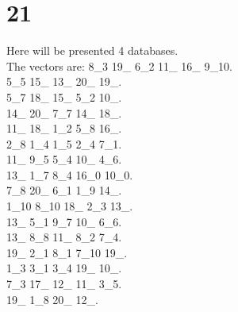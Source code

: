 \chapter{21}
\indent Here will be presented 4 databases.\\
The vectors are:
8\_3 19\_ 6\_2 11\_ 16\_ 9\_10.\\5\_5 15\_ 13\_ 20\_ 19\_.\\5\_7 18\_ 15\_ 5\_2 10\_.\\14\_ 20\_ 7\_7 14\_ 18\_.\\11\_ 18\_ 1\_2 5\_8 16\_.\\2\_8 1\_4 1\_5 2\_4 7\_1.\\11\_ 9\_5 5\_4 10\_ 4\_6.\\13\_ 1\_7 8\_4 16\_0 10\_0.\\7\_8 20\_ 6\_1 1\_9 14\_.\\1\_10 8\_10 18\_ 2\_3 13\_.\\13\_ 5\_1 9\_7 10\_ 6\_6.\\13\_ 8\_8 11\_ 8\_2 7\_4.\\19\_ 2\_1 8\_1 7\_10 19\_.\\1\_3 3\_1 3\_4 19\_ 10\_.\\7\_3 17\_ 12\_ 11\_ 3\_5.\\19\_ 1\_8 20\_ 12\_.\\
